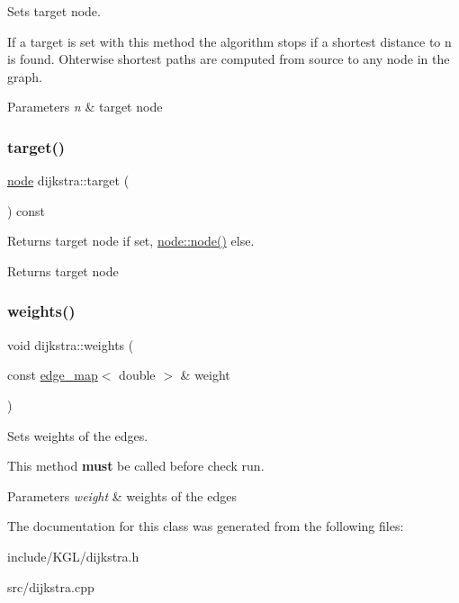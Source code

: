 Sets target node. 

If a target is set with this method the algorithm stops if a shortest distance to {\ttfamily n} is found. Ohterwise shortest paths are computed from source to any node in the graph.


\begin{DoxyParams}{Parameters}
{\em n} & target node \\
\hline
\end{DoxyParams}
\mbox{\label{classdijkstra_a4957ef4369386ef2153359ea97da9d88}} 
\subsubsection{\texorpdfstring{target()}{target()}\hspace{0.1cm}{\footnotesize\ttfamily [2/2]}}
{\footnotesize\ttfamily \mbox{\hyperlink{classnode}{node}} dijkstra\+::target (\begin{DoxyParamCaption}{ }\end{DoxyParamCaption}) const}



Returns target node if set, {\ttfamily \mbox{\hyperlink{classnode_ad603259398d5667e3b97a6322a2bcc20}{node\+::node()}}} else. 

\begin{DoxyReturn}{Returns}
target node 
\end{DoxyReturn}
\mbox{\label{classdijkstra_a92f4394b757f6ffcb372535114a6cbf6}} 
\subsubsection{\texorpdfstring{weights()}{weights()}}
{\footnotesize\ttfamily void dijkstra\+::weights (\begin{DoxyParamCaption}\item[{const \mbox{\hyperlink{classedge__map}{edge\+\_\+map}}$<$ double $>$ \&}]{weight }\end{DoxyParamCaption})}



Sets weights of the edges. 

This method {\bfseries must} be called before check run.


\begin{DoxyParams}{Parameters}
{\em weight} & weights of the edges \\
\hline
\end{DoxyParams}


The documentation for this class was generated from the following files\+:\begin{DoxyCompactItemize}
\item 
include/\+K\+G\+L/dijkstra.\+h\item 
src/dijkstra.\+cpp\end{DoxyCompactItemize}
